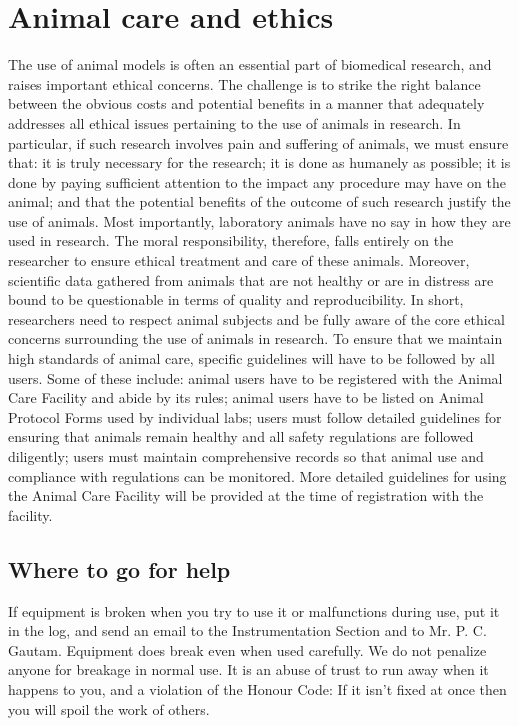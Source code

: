 \documentclass[a4paper]{extarticle}
\begin{document}
\section{Animal care and ethics}
The use of animal models is often an essential part of biomedical
research, and raises important ethical concerns. The challenge is to strike the right balance
between the obvious costs and potential benefits in a manner that adequately addresses all
ethical issues pertaining to the use of animals in research. In particular, if such research
involves pain and suffering of animals, we must ensure that: it is truly necessary for the
research; it is done as humanely as possible; it is done by paying sufficient attention to the
impact any procedure may have on the animal; and that the potential benefits of the outcome
of such research justify the use of animals. Most importantly, laboratory animals have no
say in how they are used in research. The moral responsibility, therefore, falls entirely on the
researcher to ensure ethical treatment and care of these animals. Moreover, scientific data
gathered from animals that are not healthy or are in distress are bound to be questionable in
terms of quality and reproducibility. In short, researchers need to respect animal subjects
and be fully aware of the core ethical concerns surrounding the use of animals in research.
To ensure that we maintain high standards of animal care, specific guidelines will have to be
followed by all users. Some of these include: animal users have to be registered with the
Animal Care Facility and abide by its rules; animal users have to be listed on Animal
Protocol Forms used by individual labs; users must follow detailed guidelines for ensuring
that animals remain healthy and all safety regulations are followed diligently; users must
maintain comprehensive records so that animal use and compliance with regulations can be
monitored. More detailed guidelines for using the Animal Care Facility will be provided at
the time of registration with the facility.

\subsection{Where to go for help}
If equipment is broken when you try to use it or malfunctions during
use, put it in the log, and send an email to the Instrumentation Section and to Mr. P. C.
Gautam. Equipment does break even when used carefully. We do not penalize anyone for
breakage in normal use. It is an abuse of trust to run away when it happens to you, and a
violation of the Honour Code: If it isn't fixed at once then you will spoil the work of others.
\end{document}
